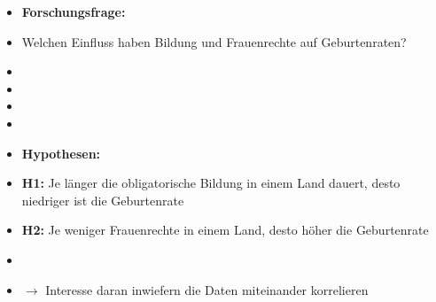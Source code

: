 \documentclass[aspectratio=169, journal, x11names, unknownkeysallowed, hyperref={colorlinks,
linkcolor = SS2,
urlcolor  = F3,
citecolor = F3,
anchorcolor = A4}, 12pt]{beamer}
\newcommand{\oarrow}{\textcolor{A1}{$\rightarrow$} }
\begin{document}
\begin{frame}[t]
  \begin{minipage}[t]{0.5\textwidth}
    \begin{itemize}
      \item[] \textbf{Forschungsfrage:}
      \item Welchen Einfluss haben Bildung und Frauenrechte auf Geburtenraten?
      \scriptsize
      \item[] 
      \item[]  
      \item[] 
      \item[] 
  \end{itemize}
  \end{minipage}%
  \begin{minipage}[t]{0.5\textwidth}
    \begin{itemize}
      \item[] \textbf{Hypothesen:}
      \item[] \textbf{H1:} Je länger die obligatorische Bildung in einem Land dauert, desto niedriger ist die Geburtenrate
      \item[] \textbf{H2:} Je weniger Frauenrechte in einem Land, desto höher die Geburtenrate
      \item[] 
      \item[] \oarrow Interesse daran inwiefern die Daten miteinander korrelieren
    \end{itemize}
  \end{minipage}
\end{frame}
\end{document}
